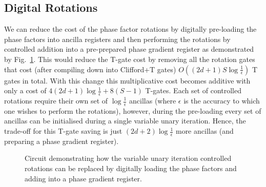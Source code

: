 \documentclass[aps,prx,twocolumn,floatfix,10pt,amssymb,amsfont,amsmath,superscriptaddress,float,nofootinbib,longbibliography,nobalancelastpage]{revtex4-2}
\theoremstyle{empty}
\begin{document}
\subsection{Digital Rotations} \label{section:improve-dg} We can reduce the cost of the phase factor rotations by digitally pre-loading the phase factors into ancilla registers and then performing the rotations by controlled addition into a pre-prepared phase gradient register \cite{gidneyHalvingCostQuantum2018} as demonstrated by Fig.~\ref{fig:phase-gradient}. This would reduce the T-gate cost by removing all the rotation gates that cost (after compiling down into Clifford+T gates) $O((2d+1)S\log \frac{1}{\epsilon})$ T gates in total. With this change this multiplicative cost becomes additive with only a cost of $4(2d+1)\log\frac{1}{\epsilon} + 8(S-1)$ T-gates. Each set of controlled rotations require their own set of $\log \frac{1}{\epsilon}$ ancillas (where $\epsilon$ is the accuracy to which one wishes to perform the rotations), however, during the pre-loading every set of ancillas can be initialised during a single variable unary iteration. Hence, the trade-off for this T-gate saving is just $(2d+2)\log \frac{1}{\epsilon}$ more ancillas (and preparing a phase gradient register).
\begin{figure}
\caption{\label{fig:phase-gradient} Circuit demonstrating how the variable unary iteration controlled rotations can be replaced by digitally loading the phase factors and adding into a phase gradient register.}
\end{figure}
\end{document}
